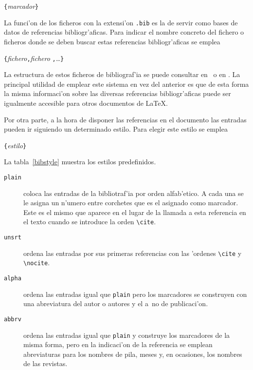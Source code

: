 \begin{command}
\verb|{|\emph{marcador}\verb|}|
\end{command}

La funci'on de los ficheros con la extensi'on \texttt{.bib} es la de
servir como bases de datos de referencias bibliogr'aficas. Para
indicar el nombre concreto del fichero o ficheros donde se deben
buscar estas referencias bibliogr'aficas se emplea

\begin{command}
\verb|{|\emph{fichero}\verb|,|\emph{fichero}%
  \verb|,|\ldots\verb|}|
\end{command}

La estructura de estos ficheros de bibliograf'ia se puede consultar en
\manual\ o en \companion. La principal utilidad de emplear este
sistema en vez del anterior es que de esta forma la misma informaci'on
sobre las diversas referencias bibliogr'aficas puede ser igualmente
accesible para otros documentos de \LaTeX.

Por otra parte, a la hora de disponer las referencias en el documento
las entradas pueden ir siguiendo un determinado estilo. Para elegir
este estilo se emplea

\begin{command}
\verb|{|\emph{estilo}\verb|}|
\end{command}

\noindent La tabla~\ref{bibstyle} muestra los estilos
predefinidos.

\begin{table}[!hbp]
\caption{Estilos de entradas bibliogr'aficas predefinidas en \LaTeX}
\label{bibstyle}
\begin{lined}{12cm}
\begin{description}
  
\item[\normalfont\texttt{plain}] coloca las entradas de la
  bibliotraf'ia por orden alfab'etico. A cada una se le asigna un
  n'umero entre corchetes que es el asignado como marcador. Este es el
  mismo que aparece en el lugar de la llamada a esta referencia en el
  texto cuando se introduce la orden \verb|\cite|.

\item[\normalfont\texttt{unsrt}] ordena las entradas por sus primeras
  referencias con las 'ordenes \verb|\cite| y \verb|\nocite|.

\item[\normalfont\texttt{alpha}] ordena las entradas igual que
  \texttt{plain} pero los marcadores se construyen con una abreviatura
  del autor o autores y el a~no de publicaci'on.

\item[\normalfont\texttt{abbrv}] ordena las entradas igual que
  \texttt{plain} y construye los marcadores de la misma forma, pero en
  la indicaci'on de la referencia se emplean abreviaturas para los
  nombres de pila, meses y, en ocasiones, los nombres de las revistas.

\end{description}
\end{lined}
\end{table}


